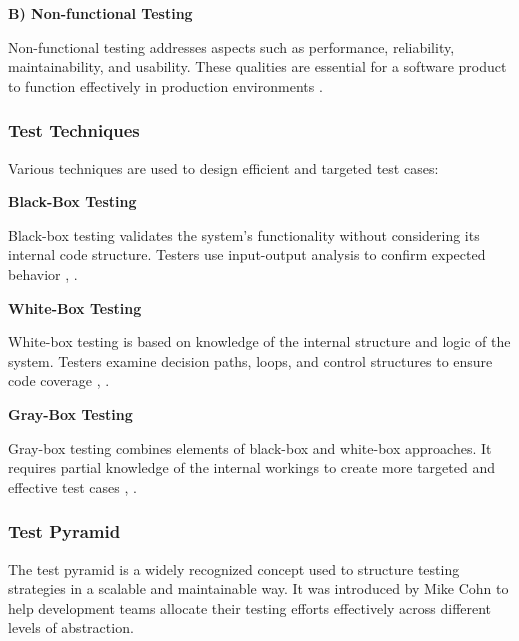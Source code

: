 \vspace{1em}
\textbf{B) Non-functional Testing}

\vspace{0.4em}
Non-functional testing addresses aspects such as performance, reliability, maintainability, and usability. These qualities are essential for a software product to function effectively in production environments \cite{kaner1999testing}.

\vspace{0.4em}
\subsubsection{Test Techniques}

Various techniques are used to design efficient and targeted test cases:

\vspace{1em}
\textbf{Black-Box Testing}

\vspace{0.4em}
Black-box testing validates the system's functionality without considering its internal code structure. Testers use input-output analysis to confirm expected behavior \cite{myers2011art}, \cite{spillner2019softwaretest}.

\vspace{1em}
\textbf{White-Box Testing}

\vspace{0.4em}
White-box testing is based on knowledge of the internal structure and logic of the system. Testers examine decision paths, loops, and control structures to ensure code coverage \cite{burnstein2003practical}, \cite{spillner2019softwaretest}.

\vspace{1em}
\textbf{Gray-Box Testing}

\vspace{0.4em}
Gray-box testing combines elements of black-box and white-box approaches. It requires partial knowledge of the internal workings to create more targeted and effective test cases \cite{ammann2016introduction}, \cite{spillner2019softwaretest}.

\subsubsection{Test Pyramid}

The test pyramid is a widely recognized concept used to structure testing strategies in a scalable and maintainable way. It was introduced by Mike Cohn \cite{cohn2009succeeding} to help development teams allocate their testing efforts effectively across different levels of abstraction.

